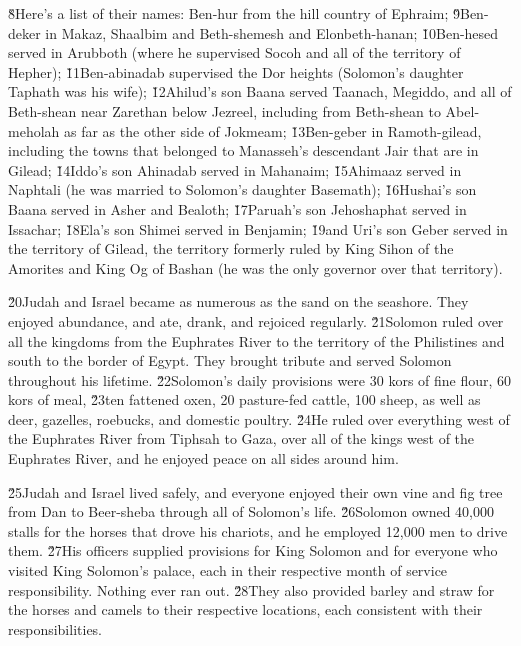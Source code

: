 \v{8}Here's a list of their names: Ben-hur from the hill country of Ephraim; \v{9}Ben-deker in Makaz, Shaalbim and Beth-shemesh and Elonbeth-hanan; \v{10}Ben-hesed served in Arubboth (where he supervised Socoh and all of the territory of Hepher); \v{11}Ben-abinadab supervised the Dor heights (Solomon's daughter Taphath was his wife); \v{12}Ahilud's son Baana served Taanach, Megiddo, and all of Beth-shean near Zarethan below Jezreel, including from Beth-shean to Abel-meholah as far as the other side of Jokmeam; \v{13}Ben-geber in Ramoth-gilead, including the towns that belonged to Manasseh's descendant Jair that are in Gilead; \v{14}Iddo's son Ahinadab served in Mahanaim; \v{15}Ahimaaz served in Naphtali (he was married to Solomon's daughter Basemath); \v{16}Hushai's son Baana served in Asher and Bealoth; \v{17}Paruah's son Jehoshaphat served in Issachar; \v{18}Ela's son Shimei served in Benjamin; \v{19}and Uri's son Geber served in the territory of Gilead, the territory formerly ruled by King Sihon of the Amorites and King Og of Bashan (he was the only governor over that territory).

\v{20}Judah and Israel became as numerous as the sand on the seashore. They enjoyed abundance, and ate, drank, and rejoiced regularly. \v{21}Solomon ruled over all the kingdoms from the Euphrates River to the territory of the Philistines and south to the border of Egypt. They brought tribute and served Solomon throughout his lifetime. \v{22}Solomon's daily provisions were 30 kors of fine flour, 60 kors of meal, \v{23}ten fattened oxen, 20 pasture-fed cattle, 100 sheep, as well as deer, gazelles, roebucks, and domestic poultry. \v{24}He ruled over everything west of the Euphrates River from Tiphsah to Gaza, over all of the kings west of the Euphrates River, and he enjoyed peace on all sides around him.

\v{25}Judah and Israel lived safely, and everyone enjoyed their own vine and fig tree from Dan to Beer-sheba through all of Solomon's life. \v{26}Solomon owned 40,000 stalls for the horses that drove his chariots, and he employed 12,000 men to drive them. \v{27}His officers supplied provisions for King Solomon and for everyone who visited King Solomon's palace, each in their respective month of service responsibility. Nothing ever ran out. \v{28}They also provided barley and straw for the horses and camels to their respective locations, each consistent with their responsibilities.

